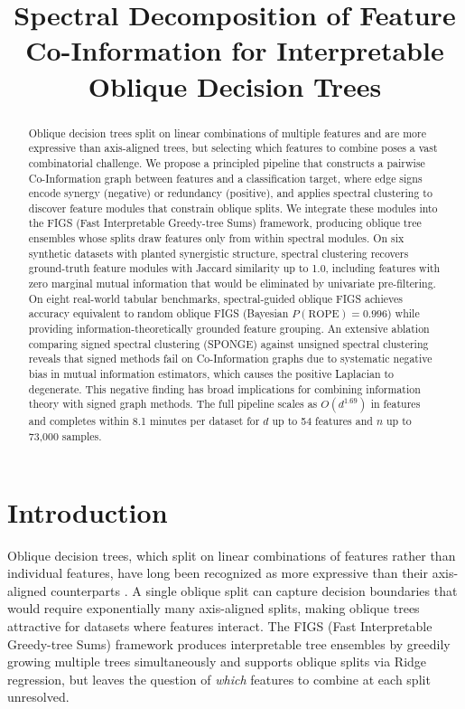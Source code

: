\documentclass[11pt,letterpaper]{article}
\title{Spectral Decomposition of Feature Co-Information for Interpretable Oblique Decision Trees}
\author{}
\date{}
\begin{document}
\maketitle

\begin{abstract}
Oblique decision trees split on linear combinations of multiple features and are more expressive than axis-aligned trees,
but selecting which features to combine poses a vast combinatorial challenge. We propose a principled pipeline that constructs
a pairwise Co-Information graph between features and a classification target, where edge signs encode synergy (negative)
or redundancy (positive), and applies spectral clustering to discover feature modules that constrain oblique splits. We
integrate these modules into the FIGS (Fast Interpretable Greedy-tree Sums) framework, producing oblique tree ensembles
whose splits draw features only from within spectral modules. On six synthetic datasets with planted synergistic structure,
spectral clustering recovers ground-truth feature modules with Jaccard similarity up to 1.0, including features with zero
marginal mutual information that would be eliminated by univariate pre-filtering. On eight real-world tabular benchmarks,
spectral-guided oblique FIGS achieves accuracy equivalent to random oblique FIGS (Bayesian $P(\text{ROPE}) = 0.996$) while providing
information-theoretically grounded feature grouping. An extensive ablation comparing signed spectral clustering (SPONGE)
against unsigned spectral clustering reveals that signed methods fail on Co-Information graphs due to systematic negative
bias in mutual information estimators, which causes the positive Laplacian to degenerate. This negative finding has broad
implications for combining information theory with signed graph methods. The full pipeline scales as $O(d^{1.69})$ in features
and completes within 8.1 minutes per dataset for $d$ up to 54 features and $n$ up to 73,000 samples.
\end{abstract}

\section{Introduction}
\label{sec:introduction}

Oblique decision trees, which split on linear combinations of features rather than individual features, have long been recognized as more expressive than their axis-aligned counterparts \citep{Murthy1994}. A single oblique split can capture decision boundaries that would require exponentially many axis-aligned splits, making oblique trees attractive for datasets where features interact. The FIGS (Fast Interpretable Greedy-tree Sums) framework \citep{Tan2025} produces interpretable tree ensembles by greedily growing multiple trees simultaneously and supports oblique splits via Ridge regression, but leaves the question of \emph{which} features to combine at each split unresolved.
\end{document}
